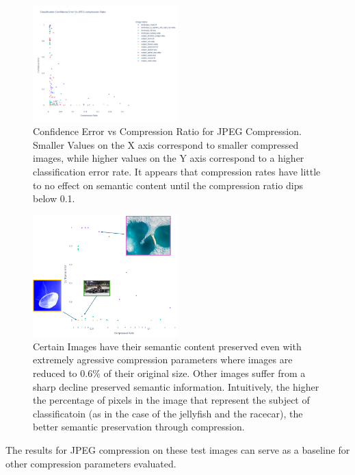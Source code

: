 \begin{figure}
    \label{fig:Comp vs Ratio JPEG Baseline}
    \includegraphics[width=0.5\textwidth]{assets/Baseline JPEG Confidence vs Comp Ratio.png}
    \caption{Confidence Error vs Compression Ratio for JPEG Compression. Smaller Values on the X axis correspond to smaller compressed images, while higher values on the Y axis correspond to a higher classification error rate. It appears that compression rates have little to no effect on semantic content until the compression ratio dips below 0.1.}
\end{figure}

\begin{figure}
    \label{fig:Annotated JPEG Baseline}
    \includegraphics[width=0.5\textwidth]{assets/JPEG Baseline Compression with Examples}
    \caption{Certain Images have their semantic content preserved even with extremely agressive compression parameters where images are reduced to 0.6\% of their original size. Other images suffer from a sharp decline preserved semantic information. Intuitively, the higher the percentage of pixels in the image that represent the subject of classificatoin (as in the case of the jellyfish and the racecar), the better semantic preservation through compression.}
\end{figure}

The results for JPEG compression on these test images can serve as a baseline for other compression parameters evaluated.


